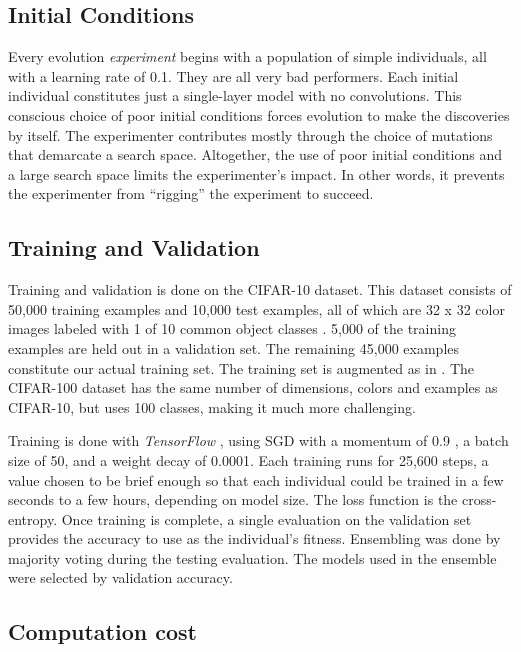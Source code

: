 \documentclass{article}
\renewcommand{\cite}[1]{\citep{#1}}
\begin{document}
\subsection{Initial Conditions}


Every evolution {\em experiment} begins with a population of simple individuals, all with a learning rate of 0.1. They are all very bad performers. Each initial individual constitutes just a single-layer model with no convolutions. This conscious choice of poor initial conditions forces evolution to make the discoveries by itself. The experimenter contributes mostly through the choice of mutations that demarcate a search space. Altogether, the use of poor initial conditions and a large search space limits the experimenter's impact. In other words, it prevents the experimenter from ``rigging'' the experiment to succeed.


\subsection{Training and Validation}
\label{training_and_validation_section}

Training and validation is done on the CIFAR-10 dataset. This dataset consists of 50,000 training examples and 10,000 test examples, all of which are 32 x 32 color images labeled with 1 of 10 common object classes \cite{krizhevsky2009learning}. 5,000 of the training examples are held out in a validation set. The remaining 45,000 examples constitute our actual training set. The training set is augmented as in \citet{he2016deep}. The CIFAR-100 dataset has the same number of dimensions, colors and examples as CIFAR-10, but uses 100 classes, making it much more challenging.

Training is done with {\em TensorFlow} \cite{abadi2016tensorflow}, using SGD with a momentum of 0.9 \cite{sutskever2013importance}, a batch size of 50, and a weight decay of 0.0001. Each training runs for 25,600 steps, a value chosen to be brief enough so that each individual could be trained in a few seconds to a few hours, depending on model size. The loss function is the cross-entropy. Once training is complete, a single evaluation on the validation set provides the accuracy to use as the individual's fitness. Ensembling was done by majority voting during the testing evaluation. The models used in the ensemble were selected by validation accuracy.


\subsection{Computation cost}
\end{document}
